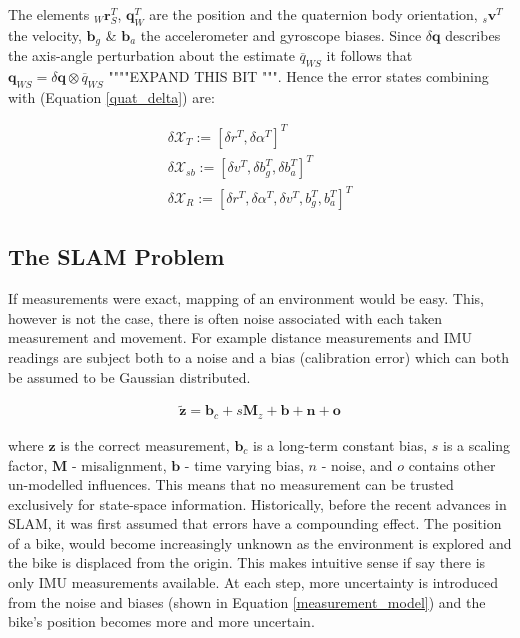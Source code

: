 \documentclass[11pt,twoside]{report}
\begin{document}
The elements $_{W}\textbf{r}_{S}^{T}$, $\textbf{{q}}_{W}^{T}$ are the position and the quaternion body orientation, $_{s}\textbf{{v}}^{T}$ the velocity, $\textbf{{b}}_{g}$ \& $\textbf{{b}}_{a}$ the accelerometer and gyroscope biases. Since $\delta \textbf{q}$ describes the axis-angle perturbation about the estimate $\overline{q}_{WS}$ it follows that $\textbf{q}_{WS} = \delta \textbf{q} \otimes \overline{q}_{WS}$ """"EXPAND THIS BIT """. Hence the error states combining with (Equation \ref{quat_delta}) are:

\begin{equation}
\begin{aligned}
\label{states_2}
\delta \mathcal{X}_{T} := [ \delta r^{T}, \delta \alpha^{T} ]^{T} \\
\delta \mathcal{X}_{sb} := [ \delta v^{T}, \delta b_{g}^{T},\delta b_{a}^{T} ]^{T} \\
\delta \mathcal{X}_{R} := [ \delta r^{T}, \delta \alpha^{T}, \delta v^{T},b_{g}^{T}, b_{a}^{T}]^{T}
\end{aligned}
\end{equation}


\subsection{The SLAM Problem}

If measurements were exact, mapping of an environment would be easy. This, however is not the case, there is often noise associated with each taken measurement and movement. For example distance measurements and IMU readings are subject both to a noise and a bias (calibration error) which can both be assumed to be Gaussian distributed.

\begin{equation}
\begin{aligned}
\mathbf{\tilde{z}} = \textbf{b}_{c} + s\textbf{M}_{z} + \textbf{b} + \textbf{n} + \textbf{o}
\end{aligned}
\label{measurement_model}
\end{equation}

where $\textbf{z}$ is the correct measurement, $\textbf{b}_{c}$ is a long-term constant bias, $s$ is a scaling factor, $\textbf{M}$ - misalignment, $\textbf{b}$ - time varying bias, $n$ - noise, and $o$ contains other un-modelled influences. This means that no measurement can be trusted exclusively for state-space information. \newline\newline
Historically, before the recent advances in SLAM, it was first assumed that errors have a compounding effect. The position of a bike, would become increasingly unknown as the environment is explored and the bike is displaced from the origin. This makes intuitive sense if say there is only IMU measurements available. At each step, more uncertainty is introduced from the noise and biases (shown in Equation \ref{measurement_model}) and the bike's position becomes more and more uncertain.
\end{document}

